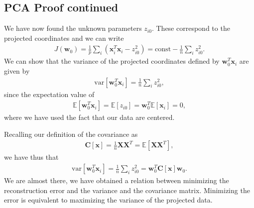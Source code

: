 \documentclass[letterpaper,10pt,english]{sphinxmanual}
\begin{document}
\subsection{PCA Proof continued}
\label{\detokenize{chapter8:pca-proof-continued}}
We have now found the unknown parameters \(z_{i0}\). These correspond to the projected coordinates and we can write
\begin{equation*}
\begin{split}
J(\boldsymbol{w}_0)= \frac{1}{p}\sum_i (\boldsymbol{x}_i^T\boldsymbol{x}_i - z_{i0}^2)=\mathrm{const}-\frac{1}{n}\sum_i z_{i0}^2.
\end{split}
\end{equation*}
We can show that the variance of the projected coordinates defined by \(\boldsymbol{w}_0^T\boldsymbol{x}_i\) are given by
\begin{equation*}
\begin{split}
\mathrm{var}[\boldsymbol{w}_0^T\boldsymbol{x}_i] = \frac{1}{n}\sum_i z_{i0}^2,
\end{split}
\end{equation*}
since the expectation value of
\begin{equation*}
\begin{split}
\mathbb{E}[\boldsymbol{w}_0^T\boldsymbol{x}_i] = \mathbb{E}[z_{i0}]= \boldsymbol{w}_0^T\mathbb{E}[\boldsymbol{x}_i]=0,
\end{split}
\end{equation*}
where we have used the fact that our data are centered.

Recalling our definition of the covariance as
\begin{equation*}
\begin{split}
\boldsymbol{C}[\boldsymbol{x}] = \frac{1}{n}\boldsymbol{X}\boldsymbol{X}^T=\mathbb{E}[\boldsymbol{X}\boldsymbol{X}^T],
\end{split}
\end{equation*}
we have thus that
\begin{equation*}
\begin{split}
\mathrm{var}[\boldsymbol{w}_0^T\boldsymbol{x}_i] = \frac{1}{n}\sum_i z_{i0}^2=\boldsymbol{w}_0^T\boldsymbol{C}[\boldsymbol{x}]\boldsymbol{w}_0.
\end{split}
\end{equation*}
We are almost there, we have obtained a relation between minimizing
the reconstruction error and the variance and the covariance
matrix. Minimizing the error is equivalent to maximizing the variance
of the projected data.
\end{document}
